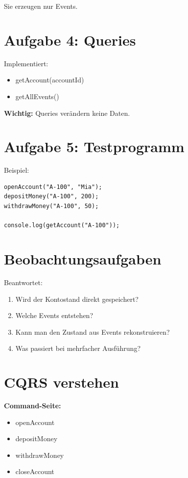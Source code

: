 \documentclass[a4paper,12pt]{article}
\begin{document}
Sie erzeugen nur Events.

\section*{Aufgabe 4: Queries}

Implementiert:

\begin{itemize}
\item getAccount(accountId)
\item getAllEvents()
\end{itemize}

\textbf{Wichtig:}  
Queries verändern keine Daten.

\section*{Aufgabe 5: Testprogramm}

Beispiel:

\begin{lstlisting}
openAccount("A-100", "Mia");
depositMoney("A-100", 200);
withdrawMoney("A-100", 50);

console.log(getAccount("A-100"));
\end{lstlisting}

\section*{Beobachtungsaufgaben}

Beantwortet:

\begin{enumerate}
\item Wird der Kontostand direkt gespeichert?
\item Welche Events entstehen?
\item Kann man den Zustand aus Events rekonstruieren?
\item Was passiert bei mehrfacher Ausführung?
\end{enumerate}

\section*{CQRS verstehen}

\textbf{Command-Seite:}
\begin{itemize}
\item openAccount
\item depositMoney
\item withdrawMoney
\item closeAccount
\end{itemize}
\end{document}
